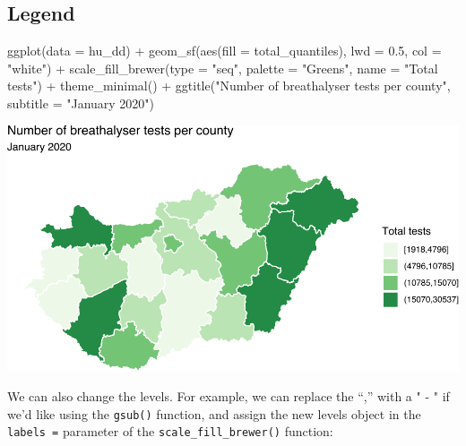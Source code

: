 \documentclass[
]{book}
\newenvironment{Shaded}{\begin{snugshade}}{\end{snugshade}}
\newcommand{\AttributeTok}[1]{\textcolor[rgb]{0.77,0.63,0.00}{#1}}
\newcommand{\FloatTok}[1]{\textcolor[rgb]{0.00,0.00,0.81}{#1}}
\newcommand{\FunctionTok}[1]{\textcolor[rgb]{0.00,0.00,0.00}{#1}}
\newcommand{\NormalTok}[1]{#1}
\newcommand{\SpecialCharTok}[1]{\textcolor[rgb]{0.00,0.00,0.00}{#1}}
\newcommand{\StringTok}[1]{\textcolor[rgb]{0.31,0.60,0.02}{#1}}
\begin{document}
\hypertarget{legend}{%
\subsection{Legend}\label{legend}}

\begin{Shaded}
\begin{Highlighting}[]
\FunctionTok{ggplot}\NormalTok{(}\AttributeTok{data =}\NormalTok{ hu\_dd) }\SpecialCharTok{+} 
  \FunctionTok{geom\_sf}\NormalTok{(}\FunctionTok{aes}\NormalTok{(}\AttributeTok{fill =}\NormalTok{ total\_quantiles), }\AttributeTok{lwd =} \FloatTok{0.5}\NormalTok{, }\AttributeTok{col =} \StringTok{"white"}\NormalTok{) }\SpecialCharTok{+} 
  \FunctionTok{scale\_fill\_brewer}\NormalTok{(}\AttributeTok{type =} \StringTok{"seq"}\NormalTok{, }\AttributeTok{palette =} \StringTok{"Greens"}\NormalTok{, }\AttributeTok{name =} \StringTok{"Total tests"}\NormalTok{) }\SpecialCharTok{+} 
  \FunctionTok{theme\_minimal}\NormalTok{() }\SpecialCharTok{+} 
  \FunctionTok{ggtitle}\NormalTok{(}\StringTok{"Number of breathalyser tests per county"}\NormalTok{, }\AttributeTok{subtitle =} \StringTok{"January 2020"}\NormalTok{)}
\end{Highlighting}
\end{Shaded}

\includegraphics{crime_mapping_files/figure-latex/legend-1.pdf}

We can also change the levels. For example, we can replace the ``,'' with a " - " if we'd like using the \texttt{gsub()} function, and assign the new levels object in the \texttt{labels\ =} parameter of the \texttt{scale\_fill\_brewer()} function:
\end{document}
